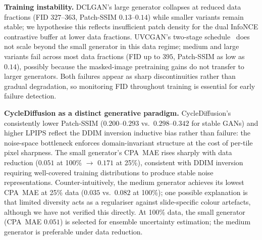 \noindent\textbf{Training instability.}
DCLGAN's large generator collapses at reduced data fractions (FID $327$--$363$,
Patch-SSIM $0.13$--$0.14$) while smaller variants remain stable; we hypothesise this
reflects insufficient patch density for the dual InfoNCE contrastive buffer at lower
data fractions.
UVCGAN's two-stage schedule~\cite{torbunov2022uvcgan} does not scale beyond the small
generator in this data regime; medium and large variants fail across most data fractions
(FID up to $395$, Patch-SSIM as low as $0.14$), possibly because the masked-image
pretraining gains do not transfer to larger generators.
Both failures appear as sharp discontinuities rather than gradual degradation, so
monitoring FID throughout training is essential for early failure detection.

\noindent\textbf{CycleDiffusion as a distinct generative paradigm.}
CycleDiffusion's consistently lower Patch-SSIM ($0.200$--$0.293$ vs.\ $0.298$--$0.342$
for stable GANs) and higher LPIPS reflect the DDIM inversion inductive bias rather
than failure: the noise-space bottleneck enforces domain-invariant structure at the cost
of per-tile pixel sharpness.
The small generator's CPA~MAE rises sharply with data reduction ($0.051$ at 100\%
$\to$ $0.171$ at 25\%), consistent with DDIM inversion requiring well-covered training
distributions to produce stable noise representations.
Counter-intuitively, the medium generator achieves its lowest CPA~MAE at 25\% data
($0.035$ vs.\ $0.082$ at 100\%); one possible explanation is that limited diversity
acts as a regulariser against slide-specific colour artefacts, although we have not
verified this directly.
At 100\% data, the small generator (CPA~MAE $0.051$) is selected for ensemble
uncertainty estimation; the medium generator is preferable under data reduction.

